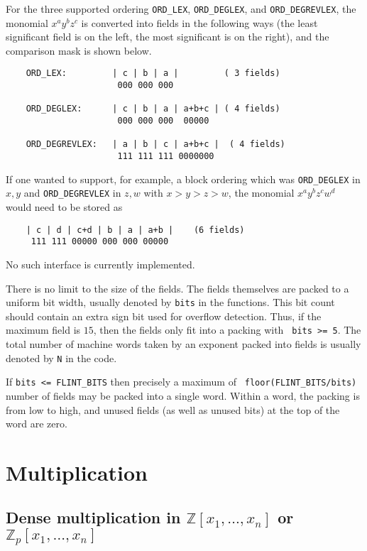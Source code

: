 \documentclass[11pt,reqno]{amsart}
\numberwithin{equation}{section}
\newcommand{\bbZ}[0]  { \mathbb{Z}}
\begin{document}
For the three supported ordering {\tt ORD\_LEX}, {\tt ORD\_DEGLEX}, and
{\tt ORD\_DEGREVLEX}, the
monomial $x^a y^b z^c$ is converted into fields in the following ways (the
least significant field is on the left, the most significant is on the right),
and the comparison mask is shown below.

\begin{verbatim}
    ORD_LEX:         | c | b | a |         ( 3 fields)
                      000 000 000

    ORD_DEGLEX:      | c | b | a | a+b+c | ( 4 fields)
                      000 000 000  00000

    ORD_DEGREVLEX:   | a | b | c | a+b+c |  ( 4 fields)
                      111 111 111 0000000
\end{verbatim}

If one wanted to support, for example, a block ordering which was {\tt ORD\_DEGLEX}
in $x, y$ and {\tt ORD\_DEGREVLEX} in $z, w$ with $x>y>z>w$,
the monomial $x^a y^b z^c w^d$ would need to be stored as

\begin{verbatim}
    | c | d | c+d | b | a | a+b |    (6 fields)
     111 111 00000 000 000 00000
\end{verbatim}

No such interface is currently implemented.


There is no limit to the size of the fields. The fields themselves are packed
to a uniform bit width, usually denoted by {\tt bits} in the functions. This 
bit count should contain an extra sign bit used for overflow detection. Thus, 
if the maximum field is $15$, then the fields only fit into a packing with {\tt 
bits >= 5}. The total number of machine words taken by an exponent packed into 
fields is usually denoted by {\tt N} in the code.

If {\tt bits <= FLINT\_BITS} then precisely a maximum of {\tt 
floor(FLINT\_BITS/bits)} number of fields may be packed into a single word. 
Within a word, the packing is from low to high, and unused fields (as well as 
unused bits) at the top of the word are zero.

\section{Multiplication}
\subsection{Dense multiplication in $\bbZ[x_1,\dots,x_n]$ or 
$\bbZ_p[x_1,\dots,x_n]$}\
\end{document}
